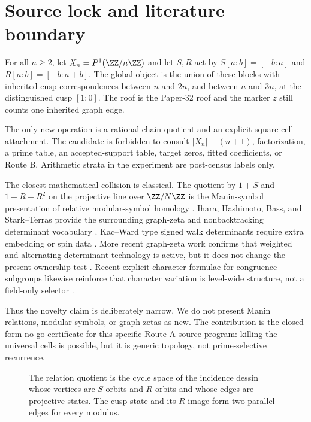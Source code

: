 \section{Source lock and literature boundary}
\label{sec:source}

\begin{definition}
For all $n\ge2$, let $X_n=P^1(\ZZ/n\ZZ)$ and let $S,R$ act by
$S[a:b]=[-b:a]$ and $R[a:b]=[-b:a+b]$.  The global object is the union of
these blocks with inherited cusp correspondences between $n$ and $2n$, and
between $n$ and $3n$, at the distinguished cusp $[1:0]$.  The roof is the
Paper-32 roof and the marker $z$ still counts one inherited graph edge.
\end{definition}

The only new operation is a rational chain quotient and an explicit square
cell attachment.  The candidate is forbidden to consult $|X_n|-(n+1)$,
factorization, a prime table, an accepted-support table, target zeros, fitted
coefficients, or Route B.  Arithmetic strata in the experiment are
post-census labels only.

The closest mathematical collision is classical.  The quotient by
$1+S$ and $1+R+R^2$ on the projective line over $\ZZ/N\ZZ$ is the Manin-symbol
presentation of relative modular-symbol homology \citep{manin1972,merel1991}.
Ihara, Hashimoto, Bass, and Stark--Terras provide the surrounding graph-zeta
and nonbacktracking determinant vocabulary
\citep{ihara1966,hashimoto1989,bass1992,starkterras1996}.  Kac--Ward type
signed walk determinants require extra embedding or spin data
\citep{kacward1952,cimasoni2010}.  More recent graph-zeta work confirms that
weighted and alternating determinant technology is active, but it does not
change the present ownership test \citep{lau2025,ishikawa2026,lu2026}.
Recent explicit character formulae for congruence subgroups likewise reinforce
that character variation is level-wide structure, not a field-only selector
\citep{zhu2025}.

Thus the novelty claim is deliberately narrow.  We do not present Manin
relations, modular symbols, or graph zetas as new.  The contribution is the
closed-form no-go certificate for this specific Route-A source program:
killing the universal cells is possible, but it is generic topology, not
prime-selective recurrence.

\begin{figure}[t]
  \centering
  
  \caption{The relation quotient is the cycle space of the incidence dessin
  whose vertices are $S$-orbits and $R$-orbits and whose edges are projective
  states.  The cusp state and its $R$ image form two parallel edges for every
  modulus.}
  \label{fig:dessin}
\end{figure}
